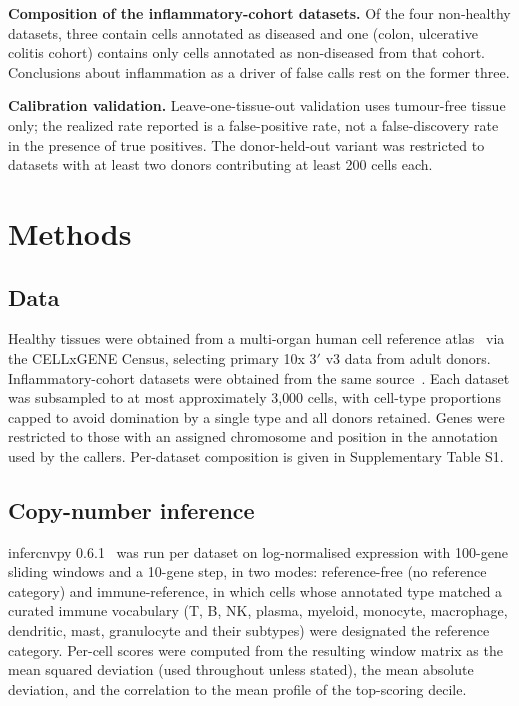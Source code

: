 \documentclass[11pt]{article}
\begin{document}
\textbf{Composition of the inflammatory-cohort datasets.} Of the four
non-healthy datasets, three contain cells annotated as diseased and one
(colon, ulcerative colitis cohort) contains only cells annotated as
non-diseased from that cohort. Conclusions about inflammation as a driver of
false calls rest on the former three.

\textbf{Calibration validation.} Leave-one-tissue-out validation uses
tumour-free tissue only; the realized rate reported is a false-positive rate,
not a false-discovery rate in the presence of true positives. The
donor-held-out variant was restricted to datasets with at least two donors
contributing at least 200 cells each.

\section{Methods}

\subsection{Data}

Healthy tissues were obtained from a multi-organ human cell reference
atlas~\cite{tabula} via the CELLxGENE Census, selecting primary 10x 3$'$ v3
data from adult donors. Inflammatory-cohort datasets were obtained from the
same source~\cite{kong2023,gao2021pso,smillie2019}. Each
dataset was subsampled to at most approximately 3{,}000 cells, with cell-type
proportions capped to avoid domination by a single type and all donors
retained. Genes were restricted to those with an assigned chromosome and
position in the annotation used by the callers. Per-dataset composition is
given in Supplementary Table S1.

\subsection{Copy-number inference}

infercnvpy 0.6.1~\cite{infercnvpy} was run per dataset on log-normalised expression with
100-gene sliding windows and a 10-gene step, in two modes: reference-free (no
reference category) and immune-reference, in which cells whose annotated type
matched a curated immune vocabulary (T, B, NK, plasma, myeloid, monocyte,
macrophage, dendritic, mast, granulocyte and their subtypes) were designated
the reference category. Per-cell scores were computed from the resulting
window matrix as the mean squared deviation (used throughout unless stated),
the mean absolute deviation, and the correlation to the mean profile of the
top-scoring decile.
\end{document}
